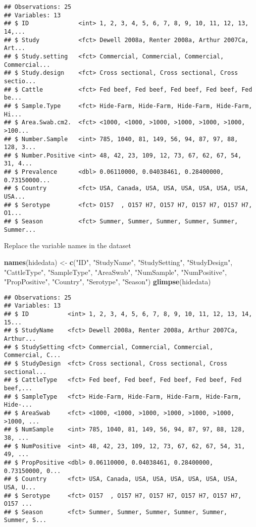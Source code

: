 \documentclass[]{article}
\newenvironment{Shaded}{\begin{snugshade}}{\end{snugshade}}
\newcommand{\KeywordTok}[1]{\textcolor[rgb]{0.13,0.29,0.53}{\textbf{#1}}}
\newcommand{\StringTok}[1]{\textcolor[rgb]{0.31,0.60,0.02}{#1}}
\newcommand{\NormalTok}[1]{#1}
\begin{document}
\begin{verbatim}
## Observations: 25
## Variables: 13
## $ ID              <int> 1, 2, 3, 4, 5, 6, 7, 8, 9, 10, 11, 12, 13, 14,...
## $ Study           <fct> Dewell 2008a, Renter 2008a, Arthur 2007Ca, Art...
## $ Study.setting   <fct> Commercial, Commercial, Commercial, Commercial...
## $ Study.design    <fct> Cross sectional, Cross sectional, Cross sectio...
## $ Cattle          <fct> Fed beef, Fed beef, Fed beef, Fed beef, Fed be...
## $ Sample.Type     <fct> Hide-Farm, Hide-Farm, Hide-Farm, Hide-Farm, Hi...
## $ Area.Swab.cm2.  <fct> <1000, <1000, >1000, >1000, >1000, >1000, >100...
## $ Number.Sample   <int> 785, 1040, 81, 149, 56, 94, 87, 97, 88, 128, 3...
## $ Number.Positive <int> 48, 42, 23, 109, 12, 73, 67, 62, 67, 54, 31, 4...
## $ Prevalence      <dbl> 0.06110000, 0.04038461, 0.28400000, 0.73150000...
## $ Country         <fct> USA, Canada, USA, USA, USA, USA, USA, USA, USA...
## $ Serotype        <fct> O157  , O157 H7, O157 H7, O157 H7, O157 H7, O1...
## $ Season          <fct> Summer, Summer, Summer, Summer, Summer, Summer...
\end{verbatim}

Replace the variable names in the dataset

\begin{Shaded}
\begin{Highlighting}[]
\KeywordTok{names}\NormalTok{(hidedata) <-}\StringTok{ }\KeywordTok{c}\NormalTok{(}\StringTok{"ID"}\NormalTok{, }\StringTok{"StudyName"}\NormalTok{, }\StringTok{"StudySetting"}\NormalTok{, }\StringTok{"StudyDesign"}\NormalTok{, }\StringTok{"CattleType"}\NormalTok{, }\StringTok{"SampleType"}\NormalTok{, }\StringTok{"AreaSwab"}\NormalTok{, }
                     \StringTok{"NumSample"}\NormalTok{, }\StringTok{"NumPositive"}\NormalTok{, }\StringTok{"PropPositive"}\NormalTok{, }\StringTok{"Country"}\NormalTok{, }\StringTok{"Serotype"}\NormalTok{, }\StringTok{"Season"}\NormalTok{)}
\KeywordTok{glimpse}\NormalTok{(hidedata)}
\end{Highlighting}
\end{Shaded}

\begin{verbatim}
## Observations: 25
## Variables: 13
## $ ID           <int> 1, 2, 3, 4, 5, 6, 7, 8, 9, 10, 11, 12, 13, 14, 15...
## $ StudyName    <fct> Dewell 2008a, Renter 2008a, Arthur 2007Ca, Arthur...
## $ StudySetting <fct> Commercial, Commercial, Commercial, Commercial, C...
## $ StudyDesign  <fct> Cross sectional, Cross sectional, Cross sectional...
## $ CattleType   <fct> Fed beef, Fed beef, Fed beef, Fed beef, Fed beef,...
## $ SampleType   <fct> Hide-Farm, Hide-Farm, Hide-Farm, Hide-Farm, Hide-...
## $ AreaSwab     <fct> <1000, <1000, >1000, >1000, >1000, >1000, >1000, ...
## $ NumSample    <int> 785, 1040, 81, 149, 56, 94, 87, 97, 88, 128, 38, ...
## $ NumPositive  <int> 48, 42, 23, 109, 12, 73, 67, 62, 67, 54, 31, 49, ...
## $ PropPositive <dbl> 0.06110000, 0.04038461, 0.28400000, 0.73150000, 0...
## $ Country      <fct> USA, Canada, USA, USA, USA, USA, USA, USA, USA, U...
## $ Serotype     <fct> O157  , O157 H7, O157 H7, O157 H7, O157 H7, O157 ...
## $ Season       <fct> Summer, Summer, Summer, Summer, Summer, Summer, S...
\end{verbatim}
\end{document}
